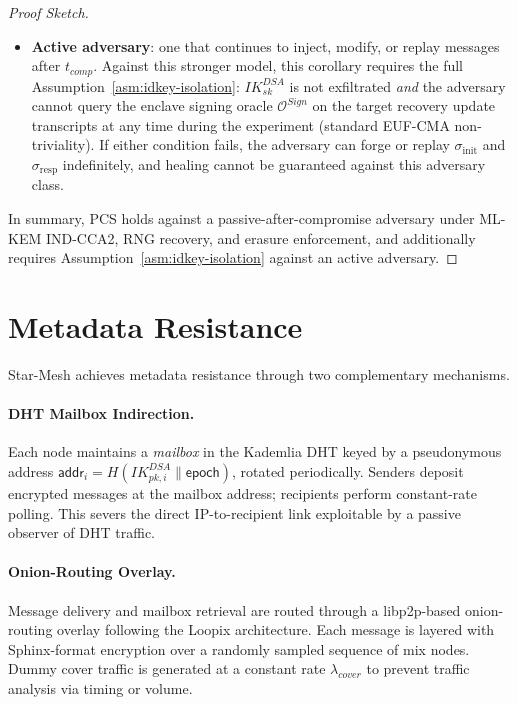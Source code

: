 \documentclass[11pt,a4paper]{article}
\theoremstyle{remark}
\theoremstyle{plain}
\newcommand{\calO}{\mathcal{O}}
\begin{document}
\begin{proof}[Proof Sketch]
\begin{itemize}
    By Assumption~\ref{asm:deletion}, $PQ^{loc}_{sk}$ and pre-recovery keys are zeroized upon update completion.
    Confidentiality of post-update epochs is thus restored without relying on DSA unforgeability.
  \item \textbf{Active adversary}: one that continues to inject, modify, or replay messages
    after $t_{comp}$.  Against this stronger model, this corollary requires the full
    Assumption~\ref{asm:idkey-isolation}: $IK^{DSA}_{sk}$ is not exfiltrated \emph{and} the
    adversary cannot query the enclave signing oracle $\calO^{Sign}$ on the target recovery update transcripts
    at any time during the experiment (standard EUF-CMA non-triviality).  If either condition
    fails, the adversary can forge or replay $\sigma_{\mathrm{init}}$ and
    $\sigma_{\mathrm{resp}}$ indefinitely, and healing cannot be guaranteed against this
    adversary class.
\end{itemize}
In summary, PCS holds against a passive-after-compromise adversary under ML-KEM IND-CCA2, RNG recovery, and erasure enforcement, and additionally requires Assumption~\ref{asm:idkey-isolation} against an active adversary.
\end{proof}

\section{Metadata Resistance}
\label{sec:metadata}

Star-Mesh achieves metadata resistance through two complementary mechanisms.

\paragraph{DHT Mailbox Indirection.}
Each node maintains a \emph{mailbox} in the Kademlia DHT keyed by a pseudonymous address
$\mathsf{addr}_i = H(IK^{DSA}_{pk,i} \| \mathsf{epoch})$, rotated periodically.  Senders
deposit encrypted messages at the mailbox address; recipients perform constant-rate polling.
This severs the direct IP-to-recipient link exploitable by a passive observer of DHT traffic.

\paragraph{Onion-Routing Overlay.}
Message delivery and mailbox retrieval are routed through a libp2p-based onion-routing overlay
following the Loopix \cite{loopix} architecture.  Each message is layered with Sphinx-format
encryption \cite{sphinx} over a randomly sampled sequence of mix nodes.  Dummy cover traffic is
generated at a constant rate $\lambda_{cover}$ to prevent traffic analysis via timing or volume.
\end{document}
